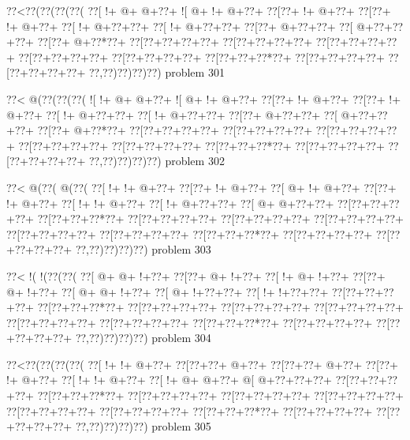 \vbox{\vbox{\goo
\0??<\0??(\0??(\0??(\0??(
\0??[\- !+\- @+\- @+\0??+
\- ![\- @+\- !+\- @+\0??+
\0??[\0??+\- !+\- @+\0??+
\0??[\0??+\- !+\- @+\0??+
\0??[\- !+\- @+\0??+\0??+
\0??[\- !+\- @+\0??+\0??+
\0??[\0??+\- @+\0??+\0??+
\0??[\- @+\0??+\0??+\0??+
\0??[\0??+\- @+\0??*\0??+
\0??[\0??+\0??+\0??+\0??+
\0??[\0??+\0??+\0??+\0??+
\0??[\0??+\0??+\0??+\0??+
\0??[\0??+\0??+\0??+\0??+
\0??[\0??+\0??+\0??+\0??+
\0??[\0??+\0??+\0??*\0??+
\0??[\0??+\0??+\0??+\0??+
\0??[\0??+\0??+\0??+\0??+
\0??,\0??)\0??)\0??)\0??)
}
\hfil problem 301\hfil\break
}

\vbox{\vbox{\goo
\0??<\- @(\0??(\0??(\0??(
\- ![\- !+\- @+\- @+\0??+
\- ![\- @+\- !+\- @+\0??+
\0??[\0??+\- !+\- @+\0??+
\0??[\0??+\- !+\- @+\0??+
\0??[\- !+\- @+\0??+\0??+
\0??[\- !+\- @+\0??+\0??+
\0??[\0??+\- @+\0??+\0??+
\0??[\- @+\0??+\0??+\0??+
\0??[\0??+\- @+\0??*\0??+
\0??[\0??+\0??+\0??+\0??+
\0??[\0??+\0??+\0??+\0??+
\0??[\0??+\0??+\0??+\0??+
\0??[\0??+\0??+\0??+\0??+
\0??[\0??+\0??+\0??+\0??+
\0??[\0??+\0??+\0??*\0??+
\0??[\0??+\0??+\0??+\0??+
\0??[\0??+\0??+\0??+\0??+
\0??,\0??)\0??)\0??)\0??)
}
\hfil problem 302\hfil\break
}

\vbox{\vbox{\goo
\0??<\- @(\0??(\- @(\0??(
\0??[\- !+\- !+\- @+\0??+
\0??[\0??+\- !+\- @+\0??+
\0??[\- @+\- !+\- @+\0??+
\0??[\0??+\- !+\- @+\0??+
\0??[\- !+\- !+\- @+\0??+
\0??[\- !+\- @+\0??+\0??+
\0??[\- @+\- @+\0??+\0??+
\0??[\0??+\0??+\0??+\0??+
\0??[\0??+\0??+\0??*\0??+
\0??[\0??+\0??+\0??+\0??+
\0??[\0??+\0??+\0??+\0??+
\0??[\0??+\0??+\0??+\0??+
\0??[\0??+\0??+\0??+\0??+
\0??[\0??+\0??+\0??+\0??+
\0??[\0??+\0??+\0??*\0??+
\0??[\0??+\0??+\0??+\0??+
\0??[\0??+\0??+\0??+\0??+
\0??,\0??)\0??)\0??)\0??)
}
\hfil problem 303\hfil\break
}

\vbox{\vbox{\goo
\0??<\- !(\- !(\0??(\0??(
\0??[\- @+\- @+\- !+\0??+
\0??[\0??+\- @+\- !+\0??+
\0??[\- !+\- @+\- !+\0??+
\0??[\0??+\- @+\- !+\0??+
\0??[\- @+\- @+\- !+\0??+
\0??[\- @+\- !+\0??+\0??+
\0??[\- !+\- !+\0??+\0??+
\0??[\0??+\0??+\0??+\0??+
\0??[\0??+\0??+\0??*\0??+
\0??[\0??+\0??+\0??+\0??+
\0??[\0??+\0??+\0??+\0??+
\0??[\0??+\0??+\0??+\0??+
\0??[\0??+\0??+\0??+\0??+
\0??[\0??+\0??+\0??+\0??+
\0??[\0??+\0??+\0??*\0??+
\0??[\0??+\0??+\0??+\0??+
\0??[\0??+\0??+\0??+\0??+
\0??,\0??)\0??)\0??)\0??)
}
\hfil problem 304\hfil\break
}

\vbox{\vbox{\goo
\0??<\0??(\0??(\0??(\0??(
\0??[\- !+\- !+\- @+\0??+
\0??[\0??+\0??+\- @+\0??+
\0??[\0??+\0??+\- @+\0??+
\0??[\0??+\- !+\- @+\0??+
\0??[\- !+\- !+\- @+\0??+
\0??[\- !+\- @+\- @+\0??+
\- @[\- @+\0??+\0??+\0??+
\0??[\0??+\0??+\0??+\0??+
\0??[\0??+\0??+\0??*\0??+
\0??[\0??+\0??+\0??+\0??+
\0??[\0??+\0??+\0??+\0??+
\0??[\0??+\0??+\0??+\0??+
\0??[\0??+\0??+\0??+\0??+
\0??[\0??+\0??+\0??+\0??+
\0??[\0??+\0??+\0??*\0??+
\0??[\0??+\0??+\0??+\0??+
\0??[\0??+\0??+\0??+\0??+
\0??,\0??)\0??)\0??)\0??)
}
\hfil problem 305\hfil\break
}

